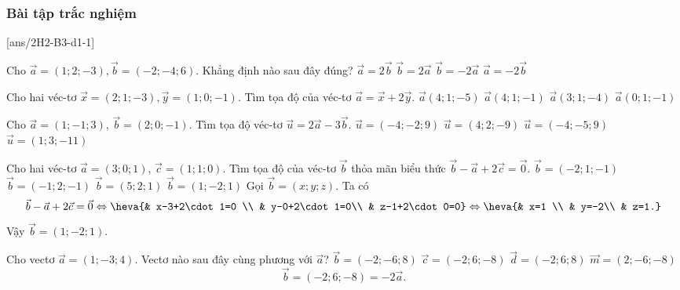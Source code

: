 \subsubsection{Bài tập trắc nghiệm}
\TN
{}[ans/2H2-B3-d1-1]
\begin{ex}
	Cho $\vec{a}=(1;2;-3),\vec{b}=(-2;-4;6)$. Khẳng định nào sau đây đúng?
	\choice
	{$\vec{a}=2\vec{b}$}
	{$\vec{b}=2\vec{a}$}
	{\True $\vec{b}=-2\vec{a}$}
	{$\vec{a}=-2\vec{b}$}
\end{ex} 

\begin{ex}
	Cho hai véc-tơ $\vec{x}=(2;1;-3),\vec{y}=(1;0;-1)$. Tìm tọa độ của véc-tơ $\vec{a}=\vec{x}+2\vec{y}$.
	\choice
	{\True $\vec{a}(4;1;-5)$}
	{$\vec{a}(4;1;-1)$}
	{$\vec{a}(3;1;-4)$}
	{$\vec{a}(0;1;-1)$}
\end{ex} 

\begin{ex}
	Cho $\vec{a}=(1;-1;3)$, $\vec{b}=(2;0;-1)$. Tìm tọa độ véc-tơ $\vec{u}=2\vec{a}-3\vec{b}$.
	\choice
	{\True $\vec{u}=(-4;-2;9)$}
	{$\vec{u}=(4;2;-9)$}
	{$\vec{u}=(-4;-5;9)$}
	{$\vec{u}=(1;3;-11)$}
\end{ex} 

\begin{ex}
	Cho hai véc-tơ  $\vec{a}=(3;0;1)$,  $\vec{c}=(1;1;0)$. Tìm tọa độ của véc-tơ $\vec{b}$ thỏa mãn biểu thức  $\vec{b}-\vec{a}+2\vec{c}=\vec{0}$.
	\choice
	{$\vec{b}=(-2;1;-1)$}
	{$\vec{b}=(-1;2;-1)$}
	{$\vec{b}=(5;2;1)$}
	{\True $\vec{b}=(1;-2;1)$}
	\loigiai
	{Gọi $\vec{b}=\left(x; y; z\right)$. Ta có
		$$\vec{b}-\vec{a}+2\vec{c}=\vec{0}\Leftrightarrow\heva{& x-3+2\cdot 1=0 \\ & y-0+2\cdot 1=0\\ & z-1+2\cdot 0=0}\Leftrightarrow\heva{& x=1 \\ & y=-2\\ & z=1.}$$
		Vậy $\vec{b}=(1;-2;1)$.
	}
\end{ex} 

\begin{ex}
	Cho vectơ $\vec{a}=(1;-3;4)$. Vectơ  nào sau đây cùng phương với $\vec{a}$?
	\choice
	{$\vec{b}=(-2;-6;8)$}
	{\True $\vec{c}=(-2;6;-8)$}
	{$\vec{d}=(-2;6;8)$}
	{$\vec{m}=(2;-6;-8)$}
	\loigiai
	{
		$$\vec{b}=(-2;6;-8)=-2\vec{a}.$$
	}
\end{ex} 

